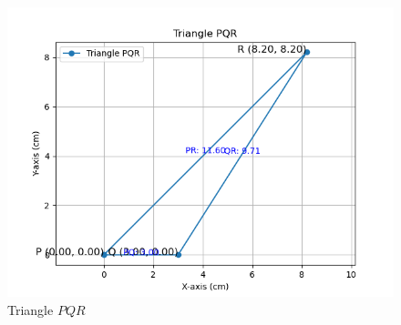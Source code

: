 \documentclass[journal]{IEEEtran}
\begin{document}
\begin{figure}[h!]
   \centering
   \includegraphics[width=0.7\linewidth]{figs/triangle_plot.png}
   \caption{Triangle $PQR$}
\end{figure}
\end{document}
